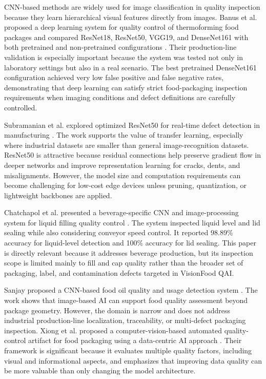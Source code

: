 \documentclass[12pt,a4paper]{report}
\newcommand{\shorttitle}{VisionFood QAI}
\begin{document}
CNN-based methods are widely used for image classification in quality inspection because they learn hierarchical visual features directly from images. Banus et al. proposed a deep learning system for quality control of thermoforming food packages and compared ResNet18, ResNet50, VGG19, and DenseNet161 with both pretrained and non-pretrained configurations \cite{banus2021thermoforming}. Their production-line validation is especially important because the system was tested not only in laboratory settings but also in a real scenario. The best pretrained DenseNet161 configuration achieved very low false positive and false negative rates, demonstrating that deep learning can satisfy strict food-packaging inspection requirements when imaging conditions and defect definitions are carefully controlled.

Subramanian et al. explored optimized ResNet50 for real-time defect detection in manufacturing \cite{subramanian2025resnet}. The work supports the value of transfer learning, especially where industrial datasets are smaller than general image-recognition datasets. ResNet50 is attractive because residual connections help preserve gradient flow in deeper networks and improve representation learning for cracks, dents, and misalignments. However, the model size and computation requirements can become challenging for low-cost edge devices unless pruning, quantization, or lightweight backbones are applied.

Chatchapol et al. presented a beverage-specific CNN and image-processing system for liquid filling quality control \cite{chatchapol2024liquid}. The system inspected liquid level and lid sealing while also considering conveyor speed control. It reported 98.89\% accuracy for liquid-level detection and 100\% accuracy for lid sealing. This paper is directly relevant because it addresses beverage production, but its inspection scope is limited mainly to fill and cap quality rather than the broader set of packaging, label, and contamination defects targeted in \shorttitle.

Sanjay proposed a CNN-based food oil quality and usage detection system \cite{sanjay2024foodoil}. The work shows that image-based AI can support food quality assessment beyond package geometry. However, the domain is narrow and does not address industrial production-line localization, traceability, or multi-defect packaging inspection. Xiong et al. proposed a computer-vision-based automated quality-control artifact for food packaging using a data-centric AI approach \cite{xiong2024artifact}. Their framework is significant because it evaluates multiple quality factors, including visual and informational aspects, and emphasizes that improving data quality can be more valuable than only changing the model architecture.
\end{document}
